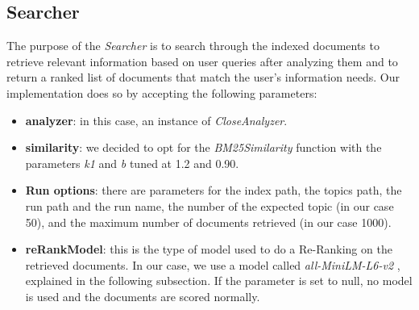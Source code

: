 \subsection{Searcher} \label{searcher_subsec}
The purpose of the \textit{Searcher} is to search through the indexed documents to retrieve relevant information based on user queries after analyzing them and to
return a ranked list of documents that match the user’s information needs.
\newline
Our implementation does so by accepting the following parameters:
\begin{itemize}
  \item \textbf{analyzer}: in this case, an instance of \textit{CloseAnalyzer}.
  \item \textbf{similarity}: we decided to opt for the \textit{BM25Similarity} \cite{lucenebm25similarity} function with the parameters \textit{k1} and \textit{b} tuned at 1.2 and 0.90.
  \item \textbf{Run options}: there are parameters for the index path, the topics path, the run path and the run name, the number of the expected topic (in our case 50), and the maximum number of documents retrieved (in our case 1000).
  \item \textbf{reRankModel}: this is the type of model used to do a Re-Ranking on the retrieved documents. 
  In our case, we use a model called \textit{all-MiniLM-L6-v2} \cite{huggingfaceallminilml6v2}, explained in the following subsection. 
  If the parameter is set to null, no model is used and the documents are scored normally.
\end{itemize}

\newpage
